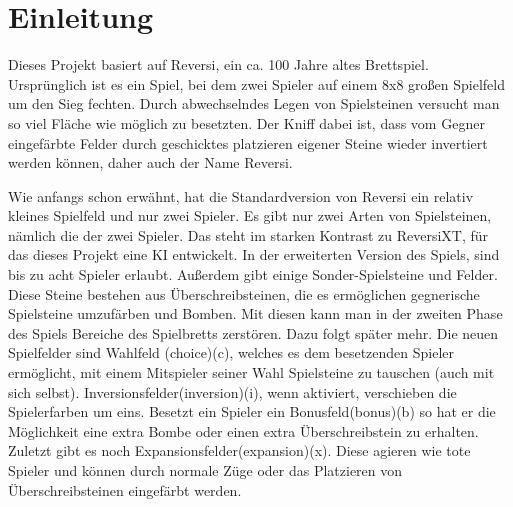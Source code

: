 \documentclass[12pt,a4paper,bibliography=totocnumbered,listof=totocnumbered]{scrartcl}
\begin{document}
    \section{Einleitung}
    \vspace{1em}


    Dieses Projekt basiert auf Reversi, ein ca. 100 Jahre altes Brettspiel. Ursprünglich ist es ein Spiel, bei dem zwei Spieler auf einem 8x8 großen Spielfeld um den Sieg fechten. Durch abwechselndes Legen von Spielsteinen versucht man so viel Fläche wie möglich zu besetzten. Der Kniff dabei ist, dass vom Gegner eingefärbte Felder durch geschicktes platzieren eigener Steine wieder invertiert werden können, daher auch der Name Reversi.

    Wie anfangs schon erwähnt, hat die Standardversion von Reversi ein relativ kleines Spielfeld und nur zwei Spieler. Es gibt nur zwei Arten von Spielsteinen, nämlich die der zwei Spieler. Das steht im starken Kontrast zu ReversiXT, für das dieses Projekt eine KI entwickelt. In der erweiterten Version des Spiels, sind bis zu acht Spieler erlaubt. Außerdem gibt einige Sonder-Spielsteine und Felder. Diese Steine bestehen aus \glqq Überschreibsteinen\grqq, die es ermöglichen gegnerische Spielsteine umzufärben und \glqq Bomben\grqq. Mit diesen kann man in der zweiten Phase des Spiels Bereiche des Spielbretts zerstören. Dazu folgt später mehr. Die neuen Spielfelder sind \glqq Wahlfeld\grqq{} (choice)(c), welches es dem besetzenden Spieler ermöglicht, mit einem Mitspieler seiner Wahl Spielsteine zu tauschen (auch mit sich selbst). \glqq Inversionsfelder\grqq (inversion)(i), wenn aktiviert, verschieben die Spielerfarben um eins. Besetzt ein Spieler ein \glqq Bonusfeld\grqq (bonus)(b) so hat er die Möglichkeit eine extra Bombe oder einen extra Überschreibstein zu erhalten. Zuletzt gibt es noch \glqq Expansionsfelder\grqq (expansion)(x). Diese agieren wie \glqq tote\grqq{} Spieler und können durch normale Züge oder das Platzieren von Überschreibsteinen eingefärbt werden.
\end{document}
